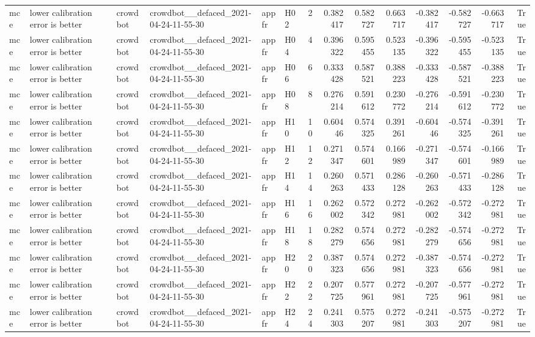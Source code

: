 \begin{longtable}{llllllrrrrrrrr}
mce & lower calibration error is better & crowdbot & crowdbot\_\_defaced\_2021-04-24-11-55-30 & appfr & H02 & 2 & 0.382417 & 0.582727 & 0.663717 & -0.382417 & -0.582727 & -0.663717 & True \\
mce & lower calibration error is better & crowdbot & crowdbot\_\_defaced\_2021-04-24-11-55-30 & appfr & H04 & 4 & 0.396322 & 0.595455 & 0.523135 & -0.396322 & -0.595455 & -0.523135 & True \\
mce & lower calibration error is better & crowdbot & crowdbot\_\_defaced\_2021-04-24-11-55-30 & appfr & H06 & 6 & 0.333428 & 0.587521 & 0.388223 & -0.333428 & -0.587521 & -0.388223 & True \\
mce & lower calibration error is better & crowdbot & crowdbot\_\_defaced\_2021-04-24-11-55-30 & appfr & H08 & 8 & 0.276214 & 0.591612 & 0.230772 & -0.276214 & -0.591612 & -0.230772 & True \\
mce & lower calibration error is better & crowdbot & crowdbot\_\_defaced\_2021-04-24-11-55-30 & appfr & H10 & 10 & 0.60446 & 0.574325 & 0.391261 & -0.60446 & -0.574325 & -0.391261 & True \\
mce & lower calibration error is better & crowdbot & crowdbot\_\_defaced\_2021-04-24-11-55-30 & appfr & H12 & 12 & 0.271347 & 0.574601 & 0.166989 & -0.271347 & -0.574601 & -0.166989 & True \\
mce & lower calibration error is better & crowdbot & crowdbot\_\_defaced\_2021-04-24-11-55-30 & appfr & H14 & 14 & 0.260263 & 0.571433 & 0.286128 & -0.260263 & -0.571433 & -0.286128 & True \\
mce & lower calibration error is better & crowdbot & crowdbot\_\_defaced\_2021-04-24-11-55-30 & appfr & H16 & 16 & 0.262002 & 0.572342 & 0.272981 & -0.262002 & -0.572342 & -0.272981 & True \\
mce & lower calibration error is better & crowdbot & crowdbot\_\_defaced\_2021-04-24-11-55-30 & appfr & H18 & 18 & 0.282279 & 0.574656 & 0.272981 & -0.282279 & -0.574656 & -0.272981 & True \\
mce & lower calibration error is better & crowdbot & crowdbot\_\_defaced\_2021-04-24-11-55-30 & appfr & H20 & 20 & 0.387323 & 0.574656 & 0.272981 & -0.387323 & -0.574656 & -0.272981 & True \\
mce & lower calibration error is better & crowdbot & crowdbot\_\_defaced\_2021-04-24-11-55-30 & appfr & H22 & 22 & 0.207725 & 0.577961 & 0.272981 & -0.207725 & -0.577961 & -0.272981 & True \\
mce & lower calibration error is better & crowdbot & crowdbot\_\_defaced\_2021-04-24-11-55-30 & appfr & H24 & 24 & 0.241303 & 0.575207 & 0.272981 & -0.241303 & -0.575207 & -0.272981 & True \\

\end{longtable}
